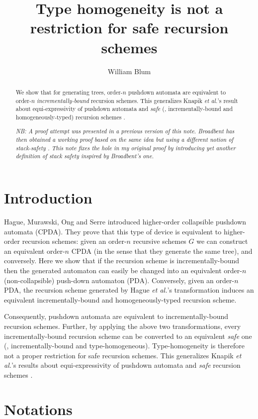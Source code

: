 \documentclass[a4paper,draft]{article}
\author{William Blum}
\title{Type homogeneity is not a restriction for safe recursion schemes}
\theoremstyle{remark}
\theoremstyle{definition}
\begin{document}
\maketitle
\begin{abstract}
We show that for generating trees, order-$n$ pushdown automata are equivalent
to order-$n$ \emph{incrementally-bound} recursion schemes. This generalizes Knapik \emph{et al.}'s result about 
equi-expressivity of pushdown automata and \emph{safe} (\ie, incrementally-bound and homogeneously-typed) recursion schemes \cite{KNU02}.

\emph{NB: A proof attempt was presented in a previous version of this note. Broadbent has then
obtained a working proof based on the same idea but using a different notion of stack-safety \cite{Broadbent2009}.
This note fixes the hole in my original proof by introducing yet another definition of stack safety inspired
by Broadbent's one.}
\end{abstract}

\section{Introduction}
Hague, Murawski, Ong and Serre \cite{hmos-lics08} introduced
higher-order collapsible pushdown automata (CPDA). They prove that this type of device is equivalent to higher-order recursion schemes: given an order-$n$ recursive schemes $G$ we can construct an equivalent order-$n$ CPDA (in the sense that they generate the same tree), and conversely. Here we show that if the recursion scheme is incrementally-bound then the generated automaton can easily be changed into an equivalent order-$n$ (non-collapsible) push-down automaton (PDA). Conversely, given an order-$n$ PDA, the recursion scheme generated by Hague \emph{et al.}'s transformation induces an equivalent incrementally-bound and homogeneously-typed recursion scheme.

Consequently, pushdown automata are equivalent to incrementally-bound recursion schemes. Further, 
by applying the above two transformations, every incrementally-bound recursion scheme can be converted to an equivalent \emph{safe} one (\ie, incrementally-bound and type-homogeneous). Type-homogeneity is therefore not a proper restriction for safe recursion schemes. This generalizes Knapik \emph{et al.}'s results about  equi-expressivity of pushdown automata and \emph{safe} recursion schemes \cite{KNU02}.

\section{Notations}
\end{document}
